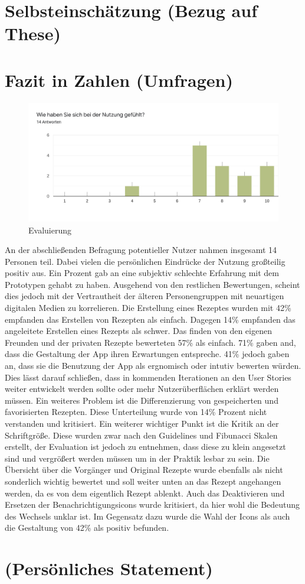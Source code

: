 \section{Selbsteinschätzung (Bezug auf These)}


\section{Fazit in Zahlen (Umfragen)}
\begin{figure}[h] %
    \includegraphics[width=1\textwidth]{images/PersonlichesEmpfinden.png}
    \caption[Evaluierung - 1 schlecht 10 sehr gut]{Evaluierung}
    \label{fig:personlicheEmpfindung}
\end{figure}
An der abschließenden Befragung potentieller Nutzer nahmen insgesamt 14 Personen teil. Dabei vielen die persönlichen Eindrücke der Nutzung großteilig positiv aus. Ein Prozent gab an eine subjektiv schlechte Erfahrung mit dem Prototypen gehabt zu haben. Ausgehend von den restlichen Bewertungen, scheint dies jedoch mit der Vertrautheit der älteren Personengruppen mit neuartigen digitalen Medien zu korrelieren. Die Erstellung eines Rezeptes wurden mit 42\% empfanden das Erstellen von Rezepten als einfach. Dagegen 14\% empfanden das angeleitete Erstellen eines Rezepts als schwer. Das finden von den eigenen Freunden und der privaten Rezepte bewerteten 57\% als einfach. 71\% gaben and, dass die Gestaltung der App ihren Erwartungen entspreche. 41\% jedoch gaben an, dass sie die Benutzung der App als ergnomisch oder intutiv bewerten würden. Dies lässt darauf schließen, dass in kommenden Iterationen an den User Stories weiter entwickelt werden sollte oder mehr Nutzerüberflächen erklärt werden müssen. Ein weiteres Problem ist die Differenzierung von gespeicherten und favorisierten Rezepten. Diese Unterteilung wurde von 14\% Prozent nicht verstanden und kritisiert. Ein weiterer wichtiger Punkt ist die Kritik an der Schriftgröße. Diese wurden zwar nach den Guidelines und Fibunacci Skalen erstellt, der Evaluation ist jedoch zu entnehmen, dass diese zu klein angesetzt sind und vergrößert werden müssen um in der Praktik lesbar zu sein. Die Übersicht über die Vorgänger und Original Rezepte wurde ebenfalls als nicht sonderlich wichtig bewertet und soll weiter unten an das Rezept angehangen werden, da es von dem eigentlich Rezept ablenkt. Auch das Deaktivieren und Ersetzen der Benachrichtigungsicons wurde kritisiert, da hier wohl die Bedeutung des Wechsels unklar ist. Im Gegensatz dazu wurde die Wahl der Icons als auch die Gestaltung von 42\% als positiv befunden. 

\section{(Persönliches Statement)}
